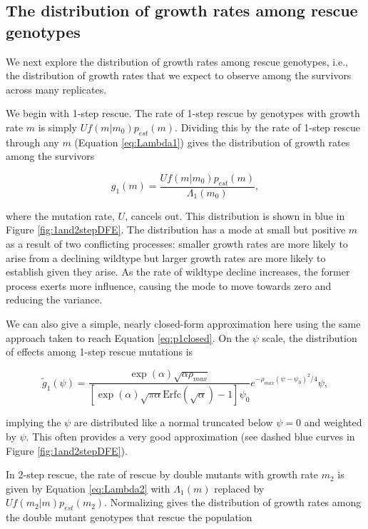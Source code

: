 \documentclass[9pt,twocolumn,twoside,lineno]{gsajnl}
\begin{document}
\subsection{The distribution of growth rates among rescue genotypes}

We next explore the distribution of growth rates among rescue genotypes, i.e., the distribution of growth rates that we expect to observe among the survivors across many replicates.

We begin with 1-step rescue.
The rate of 1-step rescue by genotypes with growth rate $m$ is simply $U f(m|m_0) p_{est}(m)$.
Dividing this by the rate of 1-step rescue through any $m$ (Equation \ref{eq:Lambda1}) gives the distribution of growth rates among the survivors

\begin{equation}\label{eq:g1m}
g_1(m) = \frac{U f(m|m_0) p_{est}(m)}{\Lambda_1(m_0)},
\end{equation}

\noindent where the mutation rate, $U$, cancels out.
This distribution is shown in blue in Figure \ref{fig:1and2stepDFE}.
The distribution has a mode at small but positive $m$ as a result of two conflicting processes: smaller growth rates are more likely to arise from a declining wildtype but larger growth rates are more likely to establish given they arise. 
As the rate of wildtype decline increases, the former process exerts more influence, causing the mode to move towards zero and reducing the variance.

We can also give a simple, nearly closed-form approximation here using the same approach taken to reach Equation \ref{eq:p1closed}.
On the $\psi$ scale, the distribution of effects among 1-step rescue mutations is

\begin{equation}\label{eq:tildeg1m}
\tilde{g}_1(\psi) = \frac{\exp(\alpha)\sqrt{\alpha \rho_{max}}}{[\exp(\alpha)\sqrt{\pi \alpha} \mathrm{Erfc}(\sqrt{\alpha}) - 1]\psi_0} e^{- \rho_{max} (\psi-\psi_0)^2/4} \psi,
\end{equation}

\noindent implying the $\psi$ are distributed like a normal truncated below $\psi=0$ and weighted by $\psi$.
This often provides a very good approximation (see dashed blue curves in Figure \ref{fig:1and2stepDFE}).

In 2-step rescue, the rate of rescue by double mutants with growth rate $m_2$ is given by Equation \ref{eq:Lambda2} with $\Lambda_1(m)$ replaced by $U f(m_2|m) p_{est}(m_2)$.
Normalizing gives the distribution of growth rates among the double mutant genotypes that rescue the population
\end{document}
